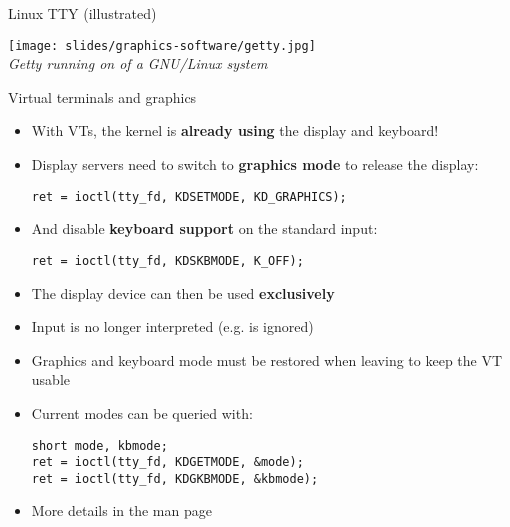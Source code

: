 \begin{frame}{Linux TTY (illustrated)}
  \begin{center}
    \texttt{[image: slides/graphics-software/getty.jpg]}\\
    \textit{Getty running on  of a GNU/Linux system}\\
  \end{center}
\end{frame}

\begin{frame}[fragile]{Virtual terminals and graphics}
  \begin{itemize}
  \item With VTs, the kernel is \textbf{already using} the display and keyboard!
  \item Display servers need to switch to \textbf{graphics mode} to release the display:
  \begin{verbatim}
ret = ioctl(tty_fd, KDSETMODE, KD_GRAPHICS);
  \end{verbatim}
  \item And disable \textbf{keyboard support} on the standard input:
  \begin{verbatim}
ret = ioctl(tty_fd, KDSKBMODE, K_OFF);
  \end{verbatim}
  \item The display device can then be used \textbf{exclusively}
  \item Input is no longer interpreted (e.g.  is ignored)
  \item Graphics and keyboard mode must be restored when leaving to keep the VT usable
  \item Current modes can be queried with:
  \begin{verbatim}
short mode, kbmode;
ret = ioctl(tty_fd, KDGETMODE, &mode);
ret = ioctl(tty_fd, KDGKBMODE, &kbmode);
  \end{verbatim}
  \item More details in the  man page
  \end{itemize}
\end{frame}

